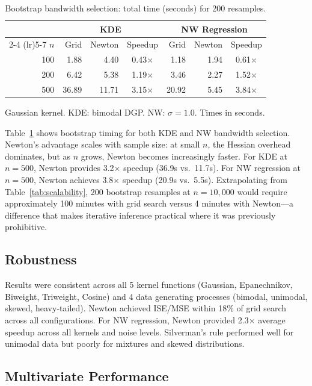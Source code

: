 \documentclass[11pt]{article}
\theoremstyle{definition}
\theoremstyle{remark}
\begin{document}
\begin{table}[t]
\centering
\caption{Bootstrap bandwidth selection: total time (seconds) for 200 resamples.}
\label{tab:bootstrap}
\begin{tabular}{rrrcrrc}
\toprule
 & \multicolumn{3}{c}{KDE} & \multicolumn{3}{c}{NW Regression} \\
\cmidrule(lr){2-4} \cmidrule(lr){5-7}
$n$ & Grid & Newton & Speedup & Grid & Newton & Speedup \\
\midrule
100 & 1.88 & 4.40 & 0.43$\times$ & 1.18 & 1.94 & 0.61$\times$ \\
200 & 6.42 & 5.38 & 1.19$\times$ & 3.46 & 2.27 & 1.52$\times$ \\
500 & 36.89 & 11.71 & 3.15$\times$ & 20.92 & 5.45 & 3.84$\times$ \\
\bottomrule
\end{tabular}

\vspace{0.5em}
\footnotesize
Gaussian kernel. KDE: bimodal DGP. NW: $\sigma=1.0$. Times in seconds.
\end{table}

Table~\ref{tab:bootstrap} shows bootstrap timing for both KDE and NW bandwidth selection.
Newton's advantage scales with sample size: at small $n$, the Hessian overhead dominates, but as $n$ grows, Newton becomes increasingly faster.
For KDE at $n=500$, Newton provides 3.2$\times$ speedup (36.9s vs.\ 11.7s).
For NW regression at $n=500$, Newton achieves 3.8$\times$ speedup (20.9s vs.\ 5.5s).
Extrapolating from Table~\ref{tab:scalability}, 200 bootstrap resamples at $n=10{,}000$ would require approximately 100 minutes with grid search versus 4 minutes with Newton---a difference that makes iterative inference practical where it was previously prohibitive.

\subsection{Robustness}

Results were consistent across all 5 kernel functions (Gaussian, Epanechnikov, Biweight, Triweight, Cosine) and 4 data generating processes (bimodal, unimodal, skewed, heavy-tailed).
Newton achieved ISE/MSE within 18\% of grid search across all configurations.
For NW regression, Newton provided 2.3$\times$ average speedup across all kernels and noise levels.
Silverman's rule performed well for unimodal data but poorly for mixtures and skewed distributions.

\subsection{Multivariate Performance}
\end{document}
